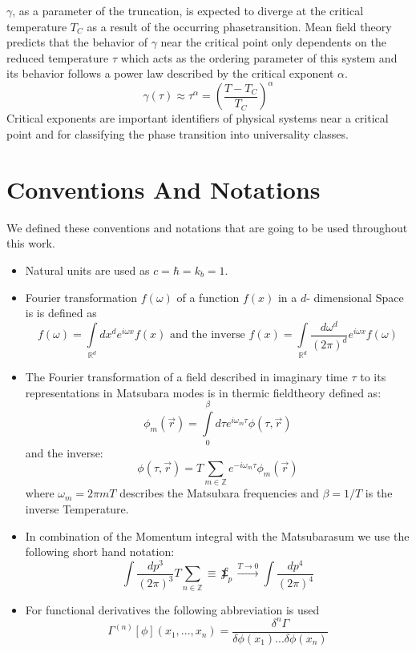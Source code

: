 $\gamma$, as a parameter of the truncation, is expected to diverge at the critical temperature $T_C$ as a result of the occurring phasetransition. Mean field theory\cite{täuber_2014} predicts that the behavior of $\gamma$ near the critical point  only dependents on the reduced temperature $\tau$ which acts as the ordering parameter of this system and its behavior follows a power law described by the critical exponent $\alpha$.
\begin{equation}
\gamma(\tau) \approx \tau^\alpha = \left(\frac{T-T_C}{T_C}\right)^\alpha
\end{equation} 
Critical exponents are important identifiers of physical systems near a critical point and for classifying the phase transition into universality classes.
\newpage
\section*{Conventions And Notations}
We defined these conventions and notations that are going to be used throughout this work.
\begin{itemize}
\item Natural units are used as $c = \hbar = k_b = 1$.
\item Fourier transformation $f(\omega)$ of a function $f(x)$ in a $d$- dimensional Space is is defined as
\begin{equation}\label{fourier_transform}
f(\omega) = \int\limits_{\mathbb{R}^d} dx^d e^{i\omega x}f(x) \text{   and the inverse   }f(x) = \int\limits_{\mathbb{R}^d} \frac{d\omega^d}{(2\pi)^d} e^{i\omega x}f(\omega)
\end{equation}
\item The Fourier transformation of a field described in imaginary time $\tau$ to its representations in Matsubara modes is in thermic fieldtheory defined as:
\begin{equation}\label{matsubara_transformation}
\phi_m(\vec r) = \int\limits_0^\beta d\tau e^{i\omega_m \tau}\phi(\tau,\vec r)
\end{equation}
and the inverse:
\begin{equation}\label{inverse_matsubara_transformation}
\phi(\tau,\vec r) = T\sum\limits_{m \in \mathbb{Z}}e^{-i\omega_m \tau}\phi_m (\vec r)
\end{equation}
where $\omega_m = 2\pi m T$ describes the Matsubara frequencies and $\beta = 1/T$ is the inverse Temperature.
\item In combination of the Momentum integral with the Matsubarasum we use the following short hand notation:
\begin{equation}\label{shorthand_matsubara}
\int \frac{dp^3}{(2\pi)^3}T\sum\limits_{n\in \mathbb{Z}}\equiv \sumint_p\xrightarrow{T\rightarrow 0}\int \frac{dp^4}{(2\pi)^4}
\end{equation}
\item For functional derivatives the following abbreviation is used
\begin{equation}\label{functional_derivative}
\Gamma^{(n)}[\phi](x_1,...,x_n) = \frac{\delta^{n}\Gamma}{\delta \phi(x_1)...\delta\phi(x_n)}
\end{equation}
\end{itemize}
